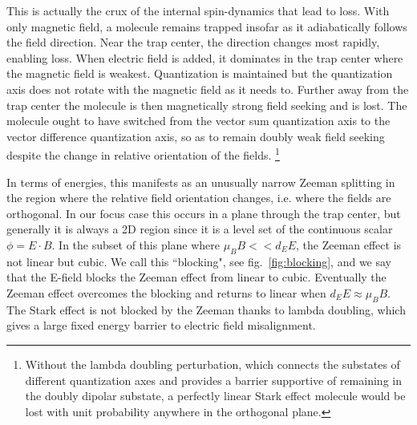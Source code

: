 \documentclass[%
 reprint,
groupedaddress,
 amsmath,amssymb,
 aps,
prl,
]{revtex4-1}
\begin{document}
This is actually the crux of the internal spin-dynamics that lead to loss. With only magnetic field, a molecule remains trapped insofar as it adiabatically follows the field direction. Near the trap center, the direction changes most rapidly, enabling loss. When electric field is added, it dominates in the trap center where the magnetic field is weakest. Quantization is maintained but the quantization axis does not rotate with the magnetic field as it needs to. Further away from the trap center the molecule is then magnetically strong field seeking and is lost. The molecule ought to have switched from the vector sum quantization axis to the vector difference quantization axis, so as to remain doubly weak field seeking despite the change in relative orientation of the fields. \footnote{Without the lambda doubling perturbation, which connects the substates of different quantization axes and provides a barrier supportive of remaining in the doubly dipolar substate, a perfectly linear Stark effect molecule would be lost with unit probability anywhere in the orthogonal plane.}%

In terms of energies, this manifests as an unusually narrow Zeeman splitting in the region where the relative field orientation changes, i.e. where the fields are orthogonal. In our focus case this occurs in a plane through the trap center, but generally it is always a 2D region since it is a level set of the continuous scalar $\phi = E\cdot B$. In the subset of this plane where $\mu_BB<<d_EE$, the Zeeman effect is not linear but cubic. We call this ``blocking", see fig.~\ref{fig:blocking}, and we say that the E-field blocks the Zeeman effect from linear to cubic. Eventually the Zeeman effect overcomes the blocking and returns to linear when $d_EE\approx\mu_BB$. The Stark effect is not blocked by the Zeeman thanks to lambda doubling, which gives a large fixed energy barrier to electric field misalignment.
\end{document}
